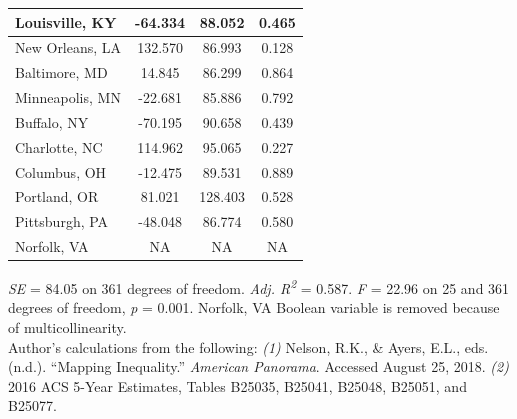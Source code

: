 \documentclass[paper=letter, fontsize=12pt]{scrartcl} %
\begin{document}
\begin{table}
\begin{center}
\begin{tabular}{|| l | c c c ||}
			\hline
			Louisville, KY & -64.334 & 88.052 & 0.465 \\
			\hline
			New Orleans, LA & 132.570 & 86.993 & 0.128 \\
			\hline
			Baltimore, MD & 14.845 & 86.299 & 0.864 \\
			\hline
			Minneapolis, MN & -22.681 & 85.886 & 0.792 \\
			\hline
			Buffalo, NY & -70.195 & 90.658 & 0.439 \\
			\hline
			Charlotte, NC & 114.962 & 95.065 & 0.227 \\
			\hline
			Columbus, OH & -12.475 & 89.531 & 0.889 \\
			\hline
			Portland, OR & 81.021 & 128.403 & 0.528 \\
			\hline
			Pittsburgh, PA & -48.048 & 86.774 & 0.580 \\
			\hline
			Norfolk, VA & NA & NA & NA \\
			\hline
		\end{tabular}
	\end{center}
\textit{SE} = 84.05 on 361 degrees of freedom. \textit{Adj. R\textsuperscript{2}} = 0.587. \textit{F} = 22.96 on 25 and 361 degrees of freedom, \textit{p} = 0.001. Norfolk, VA Boolean variable is removed because of multicollinearity.\\
Author's calculations from the following: \textit{(1)} Nelson, R.K., \& Ayers, E.L., eds. (n.d.). ``Mapping Inequality.'' \textit{American Panorama}. Accessed August 25, 2018. \textit{(2)} 2016 ACS 5-Year Estimates, Tables B25035, B25041, B25048, B25051, and B25077.
\end{table}
\end{document}
